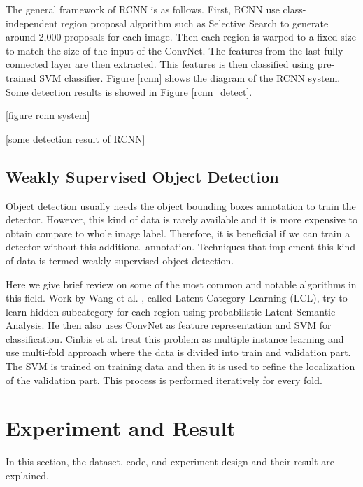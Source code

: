 \documentclass[a4paper,11pt]{kth-mag}
\begin{document}
The general framework of RCNN is as follows. First, RCNN use class-independent region proposal algorithm such as Selective Search to generate around 2,000 proposals for each image. Then each region is warped to a fixed size to match the size of the input of the ConvNet. The features from the last fully-connected layer are then extracted. This features is then classified using pre-trained SVM classifier. Figure \ref{rcnn} shows the diagram of the RCNN system. Some detection results is showed in Figure \ref{rcnn_detect}.

[figure rcnn system]

[some detection result of RCNN]

\section{Weakly Supervised Object Detection}
Object detection usually needs the object bounding boxes annotation to train the detector. However, this kind of data is rarely available and it is more expensive to obtain compare to whole image label. Therefore, it is beneficial if we can train a detector without this additional annotation. Techniques that implement this kind of data is termed weakly supervised object detection.

Here we give brief review on some of the most common and notable algorithms in this field. Work by Wang et al. \cite{wang2014lcl}, called Latent Category Learning (LCL), try to learn hidden subcategory for each region using probabilistic Latent Semantic Analysis. He then also uses ConvNet as feature representation and SVM for classification.
Cinbis et al. \cite{cinbis2014mil} treat this problem as multiple instance learning and use multi-fold approach where the data is divided into train and validation part. The SVM is trained on training data and then it is used to refine the localization of the validation part. This process is performed iteratively for every fold.


\chapter{Experiment and Result}
In this section, the dataset, code, and experiment design and their result are explained.
\end{document}

